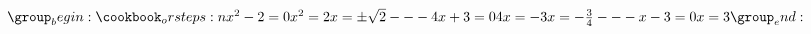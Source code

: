 \documentclass[border = 3pt]{standalone}
\begin{document}
$\orsteps{
    x^2 - 2 = 0      \\
    x^2 = 2          \\
    x = \pm \sqrt{2}
    ---
    4 x + 3 = 0       \\
    4 x = - 3         \\
    x = - \frac{3}{4}
    ---
    x - 3 = 0 \\
    x = 3
}$
\end{document}
